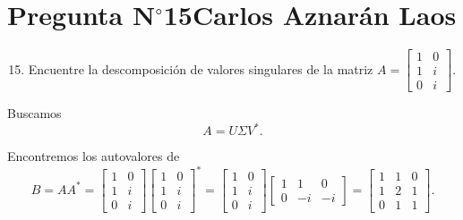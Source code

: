 \section{Pregunta N$^{\circ}$15\qquad Carlos Aznarán Laos}

\begin{frame}
	\begin{enumerate}\setcounter{enumi}{14}
		\item

		      Encuentre la descomposición de valores singulares de la matriz
		      \begin{math}
			      A=
			      \begin{bmatrix}
				      1 & 0 \\
				      1 & i \\
				      0 & i
			      \end{bmatrix}
		      \end{math}.
	\end{enumerate}

	\begin{solution}

		Buscamos
		\begin{equation*}
			A=U\Sigma V^{\ast}.
		\end{equation*}

		Encontremos los autovalores de
		\begin{equation*}
			B=
			AA^{\ast}=
			\begin{bmatrix}
				1 & 0 \\
				1 & i \\
				0 & i
			\end{bmatrix}
			{\begin{bmatrix}
				1 & 0 \\
				1 & i \\
				0 & i
			\end{bmatrix}}^{\ast}=
			\begin{bmatrix}
				1 & 0 \\
				1 & i \\
				0 & i
			\end{bmatrix}
			\begin{bmatrix}
				1 & 1  & 0  \\
				0 & -i & -i
			\end{bmatrix}=
			\begin{bmatrix}
				1 & 1 & 0 \\
				1 & 2 & 1 \\
				0 & 1 & 1
			\end{bmatrix}.
		\end{equation*}


\end{solution}
\end{frame}
